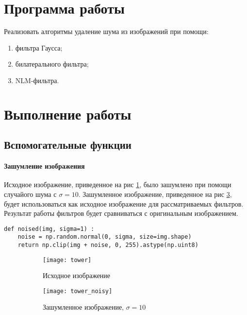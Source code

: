 





\tableofcontents
\newpage

\section{Программа работы}

Реализовать алгоритмы удаление шума из изображений при помощи:

\begin{enumerate}
	\item фильтра Гаусса;
	\item билатерального фильтра;
	\item NLM-фильтра.
\end{enumerate}

\section{Выполнение работы}

\subsection{Вспомогательные функции}

\paragraph{Зашумление изображения}

Исходное изображение, приведенное на рис \ref{fig:tower}, было зашумлено при помощи случайого шума с $\sigma = 10$. Зашумленное изображение, приведенное на рис \ref{fig:tower_noisy}, будет использоваться как исходное изображение для рассматриваемых фильтров. Результат работы фильтров будет сравниваться с оригинальным изображением.

\begin{lstlisting}[caption={Фунукция для добавления шума к изображению}]
def noised(img, sigma=1) :
	noise = np.random.normal(0, sigma, size=img.shape)
	return np.clip(img + noise, 0, 255).astype(np.uint8)
\end{lstlisting}

\begin{figure}[H]
	\centering
	\begin{subfigure}{0.48\linewidth}
		\texttt{[image: tower]}
		\caption{Исходное изображение}
		\label{fig:tower}
	\end{subfigure}
	\begin{subfigure}{0.48\linewidth}
		\texttt{[image: tower\_noisy]}
		\caption{Зашумленное изображение, $\sigma = 10$}
		\label{fig:tower_noisy}
	\end{subfigure}
	\caption{}
\end{figure}

